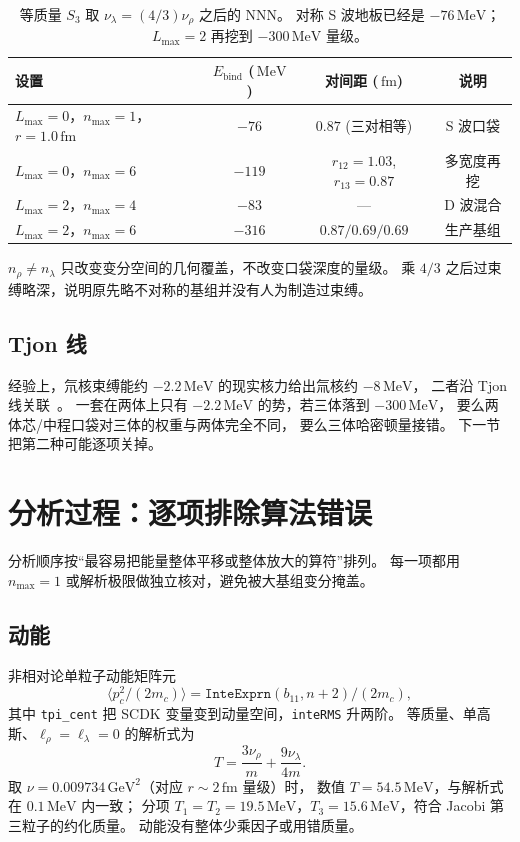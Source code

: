 \documentclass[12pt,a4paper]{article}
\newcommand{\GeV}{\,\mathrm{GeV}}
\newcommand{\MeV}{\,\mathrm{MeV}}
\newcommand{\fm}{\,\mathrm{fm}}
\begin{document}
\begin{table}[htbp]
\centering
\caption{等质量 $S_3$ 取 $\nu_\lambda=(4/3)\nu_\rho$ 之后的 NNN。
对称 S 波地板已经是 $-76\MeV$；$L_{\max}=2$ 再挖到 $-300\MeV$ 量级。}
\label{tab:nlam}
\begin{tabular}{@{}lccc@{}}
\toprule
设置 & $E_{\mathrm{bind}}$ ($\MeV$) & 对间距 ($\fm$) & 说明 \\
\midrule
$L_{\max}=0$，$n_{\max}=1$，$r=1.0\fm$ & $-76$ & $0.87$ (三对相等) & S 波口袋 \\
$L_{\max}=0$，$n_{\max}=6$ & $-119$ & $r_{12}=1.03$, $r_{13}=0.87$ & 多宽度再挖 \\
$L_{\max}=2$，$n_{\max}=4$ & $-83$ & --- & D 波混合 \\
$L_{\max}=2$，$n_{\max}=6$ & $-316$ & $0.87/0.69/0.69$ & 生产基组 \\
\bottomrule
\end{tabular}
\end{table}

$n_\rho\neq n_\lambda$ 只改变变分空间的几何覆盖，不改变口袋深度的量级。
乘 $4/3$ 之后过束缚略深，说明原先略不对称的基组并没有人为制造过束缚。

\subsection{Tjon 线}

经验上，氘核束缚能约 $-2.2\MeV$ 的现实核力给出氚核约 $-8\MeV$，
二者沿 Tjon 线关联~\cite{Tjon1975}。
一套在两体上只有 $-2.2\MeV$ 的势，若三体落到 $-300\MeV$，
要么两体芯/中程口袋对三体的权重与两体完全不同，
要么三体哈密顿量接错。
下一节把第二种可能逐项关掉。

\section{分析过程：逐项排除算法错误}

分析顺序按``最容易把能量整体平移或整体放大的算符''排列。
每一项都用 $n_{\max}=1$ 或解析极限做独立核对，避免被大基组变分掩盖。

\subsection{动能}

非相对论单粒子动能矩阵元
\begin{equation}
  \langle p_c^2/(2m_c)\rangle
  =\texttt{InteExprn}(b_{11},n+2)/(2m_c),
\end{equation}
其中 \texttt{tpi\_cent} 把 SCDK 变量变到动量空间，\texttt{inteRMS} 升两阶。
等质量、单高斯、$\ell_\rho=\ell_\lambda=0$ 的解析式为
\begin{equation}
  T=\frac{3\nu_\rho}{m}+\frac{9\nu_\lambda}{4m}.
\end{equation}
取 $\nu=0.009734\GeV^2$（对应 $r\sim 2\fm$ 量级）时，
数值 $T=54.5\MeV$，与解析式在 $0.1\MeV$ 内一致；
分项 $T_1=T_2=19.5\MeV$，$T_3=15.6\MeV$，符合 Jacobi 第三粒子的约化质量。
动能没有整体少乘因子或用错质量。
\end{document}
